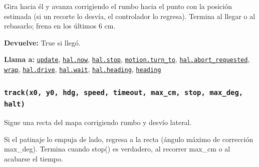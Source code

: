 Gira hacia él y avanza corrigiendo el rumbo hacia el punto con la posición estimada (si un recorte lo desvía, el controlador lo regresa). Termina al llegar o al rebasarlo; frena en los últimos 6 cm.

\par{}\par\smallskip
\noindent\textbf{Devuelve:} True si llegó.\par
\noindent\textbf{Llama a:} \hyperref[fn:odometry:update]{\texttt{update}}, \hyperref[fn:hal:now]{\texttt{hal.now}}, \hyperref[fn:hal:stop]{\texttt{hal.stop}}, \hyperref[fn:motion:turn-to]{\texttt{motion.turn\_\allowbreak{}to}}, \hyperref[fn:hal:abort-requested]{\texttt{hal.abort\_\allowbreak{}requested}}, \hyperref[fn:odometry:wrap]{\texttt{wrap}}, \hyperref[fn:hal:drive]{\texttt{hal.drive}}, \hyperref[fn:hal:wait]{\texttt{hal.wait}}, \hyperref[fn:hal:heading]{\texttt{hal.heading}}, \hyperref[fn:odometry:heading]{\texttt{heading}}\par

\subsubsection{\texttt{track(x0, y0, hdg, speed, timeout, max\_\allowbreak{}cm, stop, max\_\allowbreak{}deg, halt)}}\label{fn:odometry:track}
\noindent Sigue una recta del mapa corrigiendo rumbo y desvío lateral.

Si el patinaje lo empuja de lado, regresa a la recta (ángulo máximo de corrección max\_deg). Termina cuando stop() es verdadero, al recorrer max\_cm o al acabarse el tiempo.

